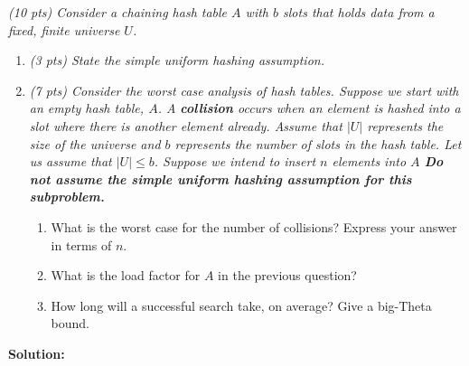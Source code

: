 \documentclass[9pt]{article}
\begin{document}
\vspace{5mm}
\item { \itshape 
	    (10 pts) Consider a chaining hash table $A$ with $b$ slots that holds data from a fixed, finite universe $U$. }
		\begin{enumerate}
		\item {\itshape (3 pts) State the simple uniform hashing assumption. }
		
		\item {\itshape (7 pts) Consider the worst case analysis of hash tables. Suppose we start with an empty hash table, $A$. A \textbf{collision} occurs when an element is hashed into a slot where there is another element already. Assume that $|U|$ represents the size of the universe and $b$ represents the number of slots in the hash table. Let us assume that $|U|\le b$. Suppose we intend to insert $n$ elements into $A$ \textbf{Do not assume the simple uniform hashing assumption for this subproblem.}
		\begin{enumerate}
	      \item What is the worst case for the number of collisions? Express your answer in terms of $n$.
	      \item What is the load factor for $A$ in the previous question?
	      \item How long will a successful search take, on average? Give a big-Theta bound.
	\end{enumerate}}
		
    \end{enumerate}
\textbf{Solution:} \\
\end{document}
